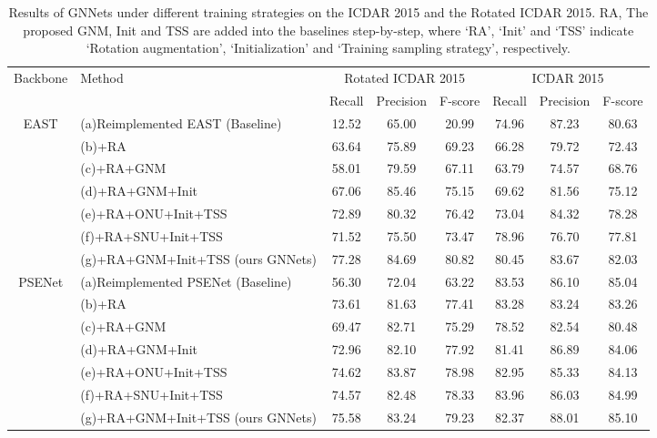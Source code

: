 \documentclass[10pt,twocolumn,letterpaper]{article}
\begin{document}
\begin{table*}[ht]
\small
\renewcommand{\arraystretch}{1.1}
\centering
\caption{Results of GNNets under different training strategies on the ICDAR 2015 and the Rotated ICDAR 2015. RA, The proposed GNM, Init and TSS are added into the baselines step-by-step, where `RA', `Init' and `TSS' indicate `Rotation augmentation', `Initialization' and `Training sampling strategy', respectively.}\label{table:training_strategies}
    \begin{tabular}{|c|l|c|c|c|c|c|c|}
      \hline
\multirow{2}{*}{Backbone} &
      \multirow{2}{*}{Method} &
      \multicolumn{3}{|c|}{Rotated ICDAR 2015} & \multicolumn{3}{|c|}{ICDAR 2015} \\ \cline{3-8}
      & & Recall & Precision  & F-score & Recall & Precision  & F-score \\ \cline{1-8}

\multirow{7}{*}{EAST}
& (a)Reimplemented EAST (Baseline) & 12.52 & 65.00 & 20.99 & 74.96 & 87.23 & 80.63 \\ \cline{2-8}
      & (b)+RA                                                    & 63.64 & 75.89 & 69.23 & 66.28 & 79.72 & 72.43 \\
      & (c)+RA+GNM                                          & 58.01 & 79.59 & 67.11 & 63.79 & 74.57 & 68.76 \\
      & (d)+RA+GNM+Init                                   & 67.06 & 85.46 & 75.15 & 69.62 & 81.56 & 75.12 \\
      & (e)+RA+ONU+Init+TSS                          & 72.89 & 80.32 & 76.42 & 73.04 & 84.32 & 78.28 \\
      & (f)+RA+SNU+Init+TSS                           & 71.52 & 75.50 & 73.47 & 78.96 & 76.70 & 77.81 \\
      & (g)+RA+GNM+Init+TSS (ours GNNets) & 77.28 & 84.69 & 80.82 & 80.45 & 83.67 & 82.03 \\
      \hline
      \multirow{7}{*}{PSENet}
& (a)Reimplemented PSENet (Baseline) & 56.30 & 72.04 & 63.22 & 83.53 & 86.10 & 85.04 \\ \cline{2-8}
      & (b)+RA                                                   & 73.61 & 81.63 & 77.41 & 83.28 & 83.24 & 83.26 \\
      & (c)+RA+GNM                                        & 69.47 & 82.71 & 75.29 & 78.52 & 82.54 & 80.48 \\
      & (d)+RA+GNM+Init                                 & 72.96 & 82.10 & 77.92 & 81.41 & 86.89 & 84.06 \\
      & (e)+RA+ONU+Init+TSS                        & 74.62 & 83.87 & 78.98 & 82.95 & 85.33 & 84.13 \\
      & (f)+RA+SNU+Init+TSS                          & 74.57 & 82.48 & 78.33 & 83.96 & 86.03 & 84.99 \\
      & (g)+RA+GNM+Init+TSS (ours GNNets)& 75.58 & 83.24 & 79.23 & 82.37 & 88.01 & 85.10 \\
      \hline
    \end{tabular}
\vspace{-4mm}
\end{table*}
\end{document}
